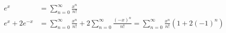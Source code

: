 \documentclass{article}
\begin{document}
\begin{align*}
  e^x &=\sum_{n=0}^\infty \frac{x^n}{n!}\\
  e^x+2e^{-x} &=\sum_{n=0}^\infty \frac{x^n}{n!}+2\sum_{n=0}^\infty\frac{(-x)^n}{n!}
  \boxed{=\sum_{n=0}^\infty \frac{x^n}{n!}\left(1+2(-1)^n\right)}
\end{align*}
\end{document}
